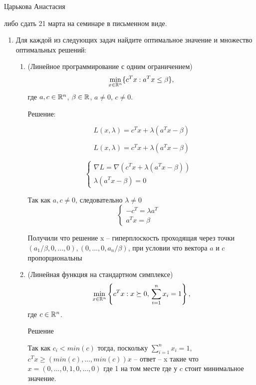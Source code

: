 \documentclass{article}
\begin{document}
\begin{mdframed}
\begin{center}
Царькова Анастасия
\end{center}
\end{mdframed}
либо сдать 21 марта на семинаре в письменном виде.

\begin{enumerate}[label=\textbf{\arabic*}, leftmargin=0em]

\item Для каждой из следующих задач найдите оптимальное значение и множество оптимальных решений:
\begin{enumerate}

\item (Линейное программирование с одним ограничением)
\begin{equation}
\min_{x \in \mathbb{R}^n} \{ c^T x : a^T x \leq \beta \},
\end{equation}
где $a, c \in \mathbb{R}^n$, $\beta \in \mathbb{R}$, $a \neq 0$, $c \neq 0$.


Решение:

$$
L(x, \lambda) = c^T x + \lambda (a^T x - \beta)
$$

$$
L(x, \lambda) = c^T x + \lambda (a^T x - \beta)
$$

$$
\begin{cases}
\nabla L = \nabla (c^T x + \lambda (a^T x - \beta)) &\\
\lambda (a^Tx - \beta) = 0
\end{cases}
$$

Так как $a, c \neq 0$, следовательно $\lambda \neq 0$
$$
\begin{cases}
- c^T =  \lambda a^T&\\
a^Tx = \beta
\end{cases}
$$

Получили что решение x -- гиперплоскость проходящая через точки $(a_1 / \beta, 0, ..., 0), (0, ..., 0, a_n / \beta)$, при условии что вектора $a$ и $c$ пропорциональны

\item (Линейная функция на стандартном симплексе)
\begin{equation}
\min_{x \in \mathbb{R}^n} \left\{ c^T x : x \succeq 0, \, \sum_{i=1}^n x_i = 1 \right\},
\end{equation}
где $c \in \mathbb{R}^n$.


Решение

Так как $c_i < min(c)$ тогда, поскольку $\sum_{i=1}^n x_i = 1$, $c^T x \geq (min(c), ..., min(c))x$ -- ответ -- x такие что $x = (0, ..., 0, 1, 0,  ..., 0)$ где 1 на том месте где у $c$ стоит минимальное значение.




\end{enumerate}
\end{enumerate}
\end{document}
